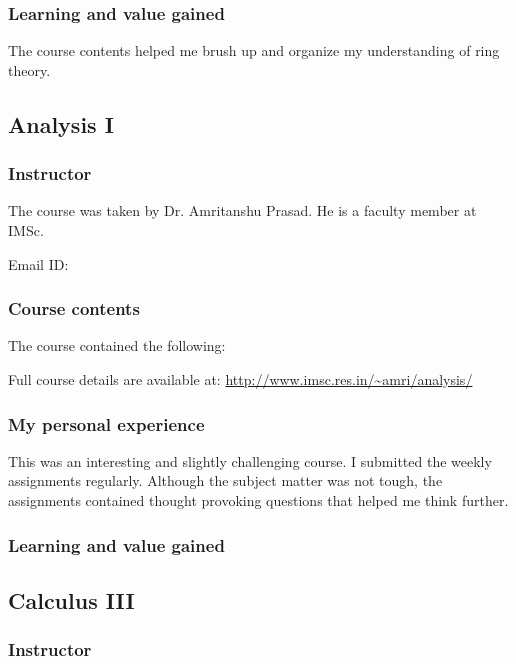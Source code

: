 \documentclass[a4paper]{amsart}
\begin{document}
\subsubsection{Learning and value gained}

The course contents helped me brush up and organize my understanding of ring theory.

\subsection{Analysis I}\label{analysis1}

\subsubsection{Instructor}

The course was taken by Dr. Amritanshu Prasad. He is a faculty member at IMSc.

Email ID: 

\subsubsection{Course contents}

The course contained the following:

Full course details are available at:
\url{http://www.imsc.res.in/~amri/analysis/}

\subsubsection{My personal experience}

This was an interesting and slightly challenging course. 
I submitted the weekly assignments regularly.
Although the subject matter was not tough,
the assignments contained thought provoking questions that helped me think
further. 

\subsubsection{Learning and value gained}


\subsection{Calculus III}\label{calculus3}

\subsubsection{Instructor}
\end{document}
